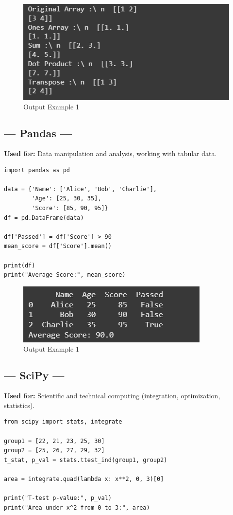 \documentclass[11pt]{article}
\begin{document}
\begin{figure}[H]
    \centering
    \includegraphics[width=0.8\linewidth]{ml1.png}
    \caption{Output Example 1}
    \label{fig:output1}
\end{figure}

\subsection*{--- Pandas ---}
\textbf{Used for:} Data manipulation and analysis, working with tabular data.
\begin{lstlisting}
import pandas as pd

data = {'Name': ['Alice', 'Bob', 'Charlie'],
        'Age': [25, 30, 35],
        'Score': [85, 90, 95]}
df = pd.DataFrame(data)

df['Passed'] = df['Score'] > 90
mean_score = df['Score'].mean()

print(df)
print("Average Score:", mean_score)
\end{lstlisting}

\begin{figure}[H]
    \centering
    \includegraphics[width=0.8\linewidth]{ml2.png}
    \caption{Output Example 1}
    \label{fig:output1}
\end{figure}

\subsection*{--- SciPy ---}
\textbf{Used for:} Scientific and technical computing (integration, optimization, statistics).
\begin{lstlisting}
from scipy import stats, integrate

group1 = [22, 21, 23, 25, 30]
group2 = [25, 26, 27, 29, 32]
t_stat, p_val = stats.ttest_ind(group1, group2)

area = integrate.quad(lambda x: x**2, 0, 3)[0]

print("T-test p-value:", p_val)
print("Area under x^2 from 0 to 3:", area)
\end{lstlisting}
\end{document}
